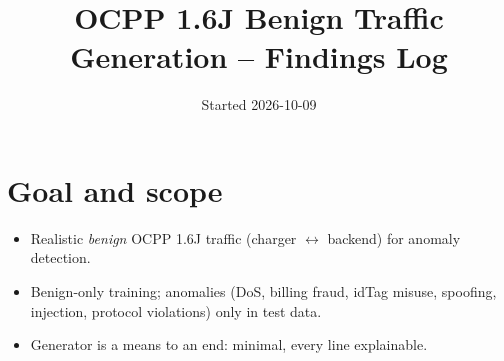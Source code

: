 \documentclass[11pt]{article}
\title{OCPP 1.6J Benign Traffic Generation -- Findings Log}
\date{Started 2026-10-09}
\begin{document}
\maketitle

\section{Goal and scope}
\begin{itemize}
  \item Realistic \emph{benign} OCPP 1.6J traffic (charger $\leftrightarrow$ backend) for anomaly detection.
  \item Benign-only training; anomalies (DoS, billing fraud, idTag misuse, spoofing, injection, protocol violations) only in test data.
  \item Generator is a means to an end: minimal, every line explainable.
\end{itemize}
\end{document}
